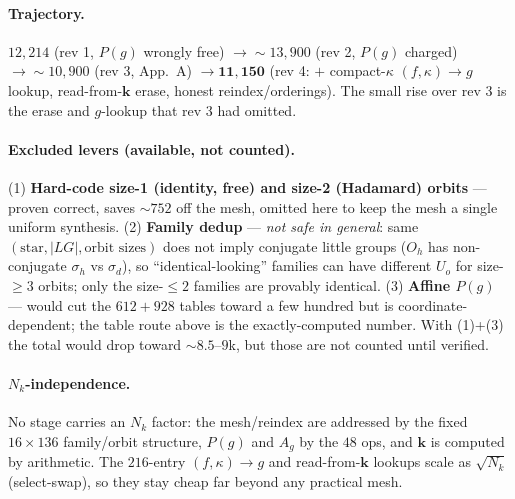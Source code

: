 \documentclass[11pt]{article}
\begin{document}
\paragraph{Trajectory.} $12{,}214$ (rev 1, $P(g)$ wrongly free) $\to \sim13{,}900$ (rev 2, $P(g)$
charged) $\to \sim10{,}900$ (rev 3, App.\ A) $\to \mathbf{11{,}150}$ (rev 4: $+$ compact-$\kappa$
$(f,\kappa)\!\to\!g$ lookup, read-from-$\mathbf k$ erase, honest reindex/orderings). The small rise
over rev 3 is the erase and $g$-lookup that rev 3 had omitted.

\paragraph{Excluded levers (available, not counted).} (1) \textbf{Hard-code size-1 (identity, free) and
size-2 (Hadamard) orbits} --- proven correct, saves $\sim\!752$ off the mesh, omitted here to keep the
mesh a single uniform synthesis. (2) \textbf{Family dedup} --- \emph{not safe in general}: same
$(\text{star},|LG|,\text{orbit sizes})$ does not imply conjugate little groups ($O_h$ has non-conjugate
$\sigma_h$ vs $\sigma_d$), so ``identical-looking'' families can have different $U_o$ for size-$\ge 3$
orbits; only the size-$\le 2$ families are provably identical. (3) \textbf{Affine $P(g)$} --- would cut
the $612{+}928$ tables toward a few hundred but is coordinate-dependent; the table route above is the
exactly-computed number. With (1)+(3) the total would drop toward $\sim\!8.5$--$9$k, but those are not
counted until verified.

\paragraph{$N_k$-independence.} No stage carries an $N_k$ factor: the mesh/reindex are addressed by the
fixed $16\times136$ family/orbit structure, $P(g)$ and $A_g$ by the $48$ ops, and $\mathbf k$ is
computed by arithmetic. The $216$-entry $(f,\kappa)\!\to\!g$ and read-from-$\mathbf k$ lookups scale as
$\sqrt{N_k}$ (select-swap), so they stay cheap far beyond any practical mesh.
\end{document}

